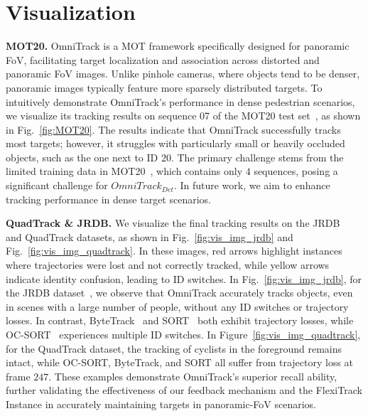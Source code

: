 \section{Visualization}
%

\noindent\textbf{MOT20.} OmniTrack is a MOT framework specifically designed for panoramic FoV, facilitating target localization and association across distorted and panoramic FoV images. Unlike pinhole cameras, where objects tend to be denser, panoramic images typically feature more sparsely distributed targets. To intuitively demonstrate OmniTrack's performance in dense pedestrian scenarios, we visualize its tracking results on sequence 07 of the MOT20 test set~\cite{dendorfer2020mot20}, as shown in Fig.~\ref{fig:MOT20}. The results indicate that OmniTrack successfully tracks most targets; however, it struggles with particularly small or heavily occluded objects, such as the one next to ID 20. The primary challenge stems from the limited training data in MOT20~\cite{dendorfer2020mot20}, which contains only $4$ sequences, posing a significant challenge for $OmniTrack_{Det}$. In future work, we aim to enhance tracking performance in dense target scenarios.

\noindent\textbf{QuadTrack \& JRDB.} We visualize the final tracking results on the JRDB~\cite{martin2021jrdb} and QuadTrack datasets, as shown in Fig.~\ref{fig:vis_img_jrdb} and Fig.~\ref{fig:vis_img_quadtrack}. 
In these images, red arrows highlight instances where trajectories were lost and not correctly tracked, while yellow arrows indicate identity confusion, leading to ID switches. In Fig.~\ref{fig:vis_img_jrdb}, for the JRDB dataset~\cite{martin2021jrdb}, we observe that OmniTrack accurately tracks objects, even in scenes with a large number of people, without any ID switches or trajectory losses. 
In contrast, ByteTrack~\cite{zhang2022bytetrack} and SORT~\cite{bewley2016simple} both exhibit trajectory losses, while OC-SORT~\cite{cao2023observation} experiences multiple ID switches. 
In Figure~\ref{fig:vis_img_quadtrack}, for the QuadTrack dataset, the tracking of cyclists in the foreground remains intact, while OC-SORT, ByteTrack, and SORT all suffer from trajectory loss at frame $247$. These examples demonstrate OmniTrack's superior recall ability, further validating the effectiveness of our feedback mechanism and the FlexiTrack Instance in accurately maintaining targets in panoramic-FoV scenarios.

